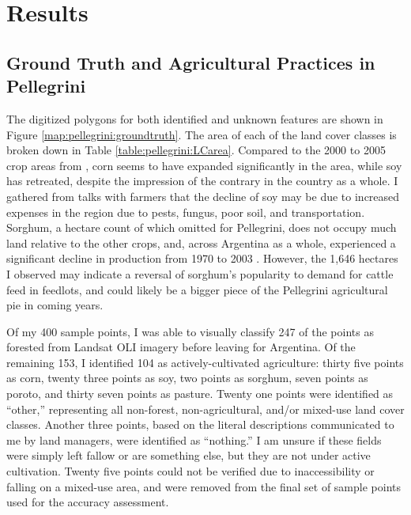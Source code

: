 \chapter{Results}
\label{chapter:results}

\section{Ground Truth and Agricultural Practices in Pellegrini}

The digitized polygons for both identified and unknown features are shown in Figure \ref{map:pellegrini:groundtruth}. The area of each of the land cover classes is broken down in Table \ref{table:pellegrini:LCarea}. Compared to the 2000 to 2005 crop areas from \textcite{volante2005analisis}, corn seems to have expanded significantly in the area, while soy has retreated, despite the impression of the contrary in the country as a whole. I gathered from talks with farmers that the decline of soy may be due to increased expenses in the region due to pests, fungus, poor soil, and transportation. Sorghum, a hectare count of which \citeauthor{volante2005analisis} omitted for Pellegrini, does not occupy much land relative to the other crops, and, across Argentina as a whole, experienced a significant decline in production from 1970 to 2003 \autocite{paruelo2005expansion}. However, the 1,646 hectares I observed may indicate a reversal of sorghum's popularity to demand for cattle feed in feedlots, and could likely be a bigger piece of the Pellegrini agricultural pie in coming years.

Of my 400 sample points, I was able to visually classify 247 of the points as forested from Landsat OLI imagery before leaving for Argentina. Of the remaining 153, I identified 104 as actively-cultivated agriculture: thirty five points as corn, twenty three points as soy, two points as sorghum, seven points as poroto, and thirty seven points as pasture. Twenty one points were identified as ``other,'' representing all non-forest, non-agricultural, and/or mixed-use land cover classes. Another three points, based on the literal descriptions communicated to me by land managers, were identified as ``nothing.'' I am unsure if these fields were simply left fallow or are something else, but they are not under active cultivation. Twenty five points could not be verified due to inaccessibility or falling on a mixed-use area, and were removed from the final set of sample points used for the accuracy assessment.

